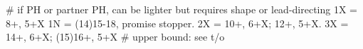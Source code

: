 # if PH or partner PH, can be lighter but requires shape or lead-directing
1X = 8+, 5+X
1N = (14)15-18, promise stopper.
2X = 10+, 6+X; 12+, 5+X.
3X = 14+, 6+X; (15)16+, 5+X
# upper bound: see t/o